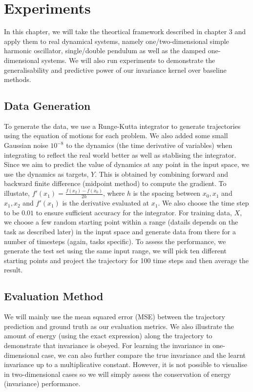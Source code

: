 \documentclass{statsmsc}
\begin{document}
\chapter{Experiments}
In this chapter, we will take the theortical framework described in chapter 3 and apply them to real dynamical systems, namely one/two-dimensional simple harmonic oscillator, single/double pendulum as well as the damped one-dimensional systems.
We will also run experiments to demonstrate the generalisability and predictive power of our invariance kernel over baseline methods.

\section{Data Generation}
To generate the data, we use a Runge-Kutta integrator to generate trajectories using the equation of motions for each problem. 
We also added some small Gaussian noise $10^{-8}$ to the dynamics (the time derivative of variables) when integrating to reflect the real world better as well as stablising the integrator.
Since we aim to predict the value of dynamics at any point in the input space, we use the dynamics as targets, $Y$. 
This is obtained by combining forward and backward finite difference (midpoint method) to compute the gradient. 
To illustate, $f'(x_1)=\frac{f(x_2)-f(x_0)}{2h}$, where $h$ is the spacing between $x_0, x_1$ and $x_1, x_2$ and $f'(x_1)$ is the derivative evaluated at $x_1$.
We also choose the time step to be $0.01$ to ensure sufficient accuracy for the integrator.
For training data, $X$, we choose a few random starting point within a range (datails depends on the task as described later) in the input space and generate data from there for a number of timesteps (again, tasks specific). 
To assess the performance, we generate the test set using the same input range, we will pick ten different starting points and project the trajectory for 100 time steps and then average the result.

\section{Evaluation Method}
We will mainly use the mean squared error (MSE) between the trajectory prediction and ground truth as our evaluation metrics. 
We also illustrate the amount of energy (using the exact expression) along the trajectory to demonstrate that invariance is obeyed.
For learning the invariance in one-dimensional case, we can also further compare the true invariance and the learnt invariance up to a multiplicative constant.
However, it is not possible to visualise in two-dimensional cases so we will simply assess the conservation of energy (invariance) performance.
\end{document}

